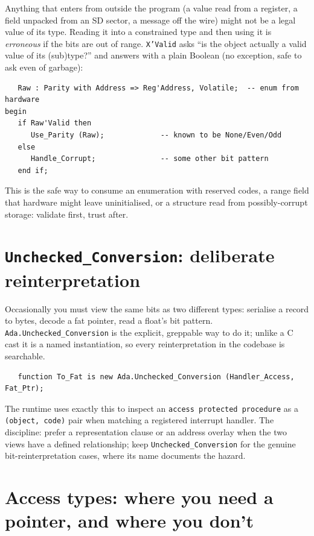 Anything that enters from outside the program (a value read from a register, a
field unpacked from an SD sector, a message off the wire) might not be a legal
value of its type. Reading it into a constrained type and then using it is
\emph{erroneous} if the bits are out of range. \texttt{X'Valid} asks ``is the
object actually a valid value of its (sub)type?'' and answers with a plain
Boolean (no exception, safe to ask even of garbage):

\begin{lstlisting}
   Raw : Parity with Address => Reg'Address, Volatile;  -- enum from hardware
begin
   if Raw'Valid then
      Use_Parity (Raw);             -- known to be None/Even/Odd
   else
      Handle_Corrupt;               -- some other bit pattern
   end if;
\end{lstlisting}

This is the safe way to consume an enumeration with reserved codes, a range field
that hardware might leave uninitialised, or a structure read from possibly-corrupt
storage: validate first, trust after.

\section{\texttt{Unchecked\_Conversion}: deliberate reinterpretation}
\label{sec:uncheck}

Occasionally you must view the same bits as two different types: serialise a
record to bytes, decode a fat pointer, read a float's bit pattern.
\texttt{Ada.Unchecked\_Conversion} is the explicit, greppable way to do it; unlike
a C cast it is a named instantiation, so every reinterpretation in the codebase is
searchable.

\begin{lstlisting}
   function To_Fat is new Ada.Unchecked_Conversion (Handler_Access, Fat_Ptr);
\end{lstlisting}

The runtime uses exactly this to inspect an \texttt{access protected procedure}
as a \texttt{(object, code)} pair when matching a registered interrupt handler.
The discipline: prefer a representation clause or an address overlay when the two
views have a defined relationship; keep \texttt{Unchecked\_Conversion} for the
genuine bit-reinterpretation cases, where its name documents the hazard.

\section{Access types: where you need a pointer, and where you don't}
\label{sec:access}

